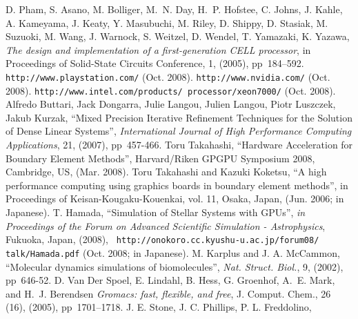 \begin{thebibliography}{10}
{\small
{} {\sc D. Pham, S. Asano, M. Bolliger, M.~N. Day,
H.~P. Hofstee, C. Johns, J. Kahle, A. Kameyama, J. Keaty,
Y. Masubuchi, M. Riley, D. Shippy, D. Stasiak, M. Suzuoki, M. Wang,
J. Warnock, S. Weitzel, D. Wendel, T. Yamazaki, K. Yazawa}, {\em The
design and implementation of a first-generation CELL processor}, in
Proceedings of Solid-State Circuits Conference, 1, (2005),
pp~184--592.\vspace*{-1mm}
{\tt http://www.playstation.com/} (Oct. 2008).\vspace*{-1mm}
{\tt http://www.nvidia.com/} (Oct. 2008).\vspace*{-1mm}
{\tt http://www.intel.com/products/ processor/xeon7000/} (Oct. 2008).\vspace*{-1mm}
 Alfredo Buttari, Jack Dongarra, Julie Langou, Julien
  Langou, Piotr Luszczek, Jakub Kurzak, ``Mixed Precision Iterative
  Refinement Techniques for the Solution of Dense Linear Systems'',
  {\it International Journal of High Performance Computing
    Applications}, 21, (2007), pp~457-466.\vspace*{-1mm}
 Toru Takahashi, ``Hardware Acceleration for
  Boundary Element Methods'', Harvard/Riken GPGPU Symposium 2008,
  Cambridge, US, (Mar. 2008).\vspace*{-1mm}
 Toru Takahashi and Kazuki Koketsu, ``A high
performance computing using graphics boards in boundary element
methods'', in Proceedings of Keisan-Kougaku-Kouenkai, vol. 11, Osaka,
Japan, (Jun. 2006; in Japanese).\vspace*{-1mm}
 T. Hamada, ``Simulation of Stellar Systems with
  GPUs'', {\it in Proceedings of the Forum on Advanced Scientific
    Simulation - Astrophysics}, Fukuoka, Japan, (2008), {\tt
    http://onokoro.cc.kyushu-u.ac.jp/forum08/ talk/Hamada.pdf}
  (Oct. 2008; in Japanese).\vspace*{-1mm}
 {M. Karplus and J. A. McCammon}, ``Molecular
dynamics simulations of biomolecules'', {\it Nat. Struct. Biol.}, 9,
(2002), pp~646-52.\vspace*{-1mm}
 {\sc D. Van Der Spoel, E. Lindahl, B. Hess,
G. Groenhof, A.~E.  Mark, and H.~J. Berendsen} {\em Gromacs: fast,
flexible, and free}, J. Comput. Chem., 26 (16), (2005), pp~1701--1718.\vspace*{-1mm}
 {J. E. Stone, J. C. Phillips, P. L. Freddolino,
}}
\end{thebibliography}
